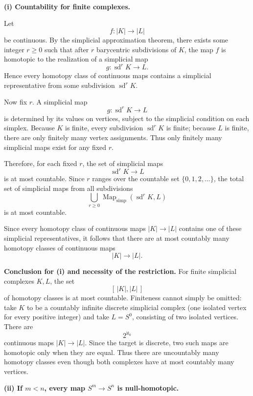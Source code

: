 \begin{solution}
\textbf{(i) Countability for finite complexes.}

Let
\[
f:|K|\to |L|
\]
be continuous. By the simplicial approximation theorem, there exists some integer \(r\ge 0\) such that after \(r\) barycentric subdivisions of \(K\), the map \(f\) is homotopic to the realization of a simplicial map
\[
g:\operatorname{sd}^r K \to L.
\]
Hence every homotopy class of continuous maps contains a simplicial representative from some subdivision \(\operatorname{sd}^r K\).

Now fix \(r\). A simplicial map
\[
g:\operatorname{sd}^r K \to L
\]
is determined by its values on vertices, subject to the simplicial condition on each simplex. Because \(K\) is finite, every subdivision \(\operatorname{sd}^r K\) is finite; because \(L\) is finite, there are only finitely many vertex assignments. Thus only finitely many simplicial maps exist for any fixed \(r\).

Therefore, for each fixed \(r\), the set of simplicial maps
\[
\operatorname{sd}^r K \to L
\]
is at most countable. Since \(r\) ranges over the countable set \(\{0,1,2,\dots\}\), the total set of simplicial maps from all subdivisions
\[
\bigcup_{r\ge 0}\operatorname{Map}_{\mathrm{simp}}(\operatorname{sd}^r K,L)
\]
is at most countable.

Since every homotopy class of continuous maps \(|K|\to |L|\) contains one of these simplicial representatives, it follows that there are at most countably many homotopy classes of continuous maps
\[
|K|\to |L|.
\]

\par

\textbf{Conclusion for (i) and necessity of the restriction.}
For finite simplicial complexes \(K,L\), the set
\[
[\,|K|,|L|\,]
\]
of homotopy classes is at most countable. Finiteness cannot simply be omitted: take \(K\) to be a countably infinite discrete simplicial complex (one isolated vertex for every positive integer) and take \(L=S^0\), consisting of two isolated vertices. There are
\[
2^{\aleph_0}
\]
continuous maps \(|K|\to|L|\). Since the target is discrete, two such maps are homotopic only when they are equal. Thus there are uncountably many homotopy classes even though both complexes have at most countably many vertices.

\par

\textbf{(ii) If \(m<n\), every map \(S^m\to S^n\) is null-homotopic.}


\end{solution}
